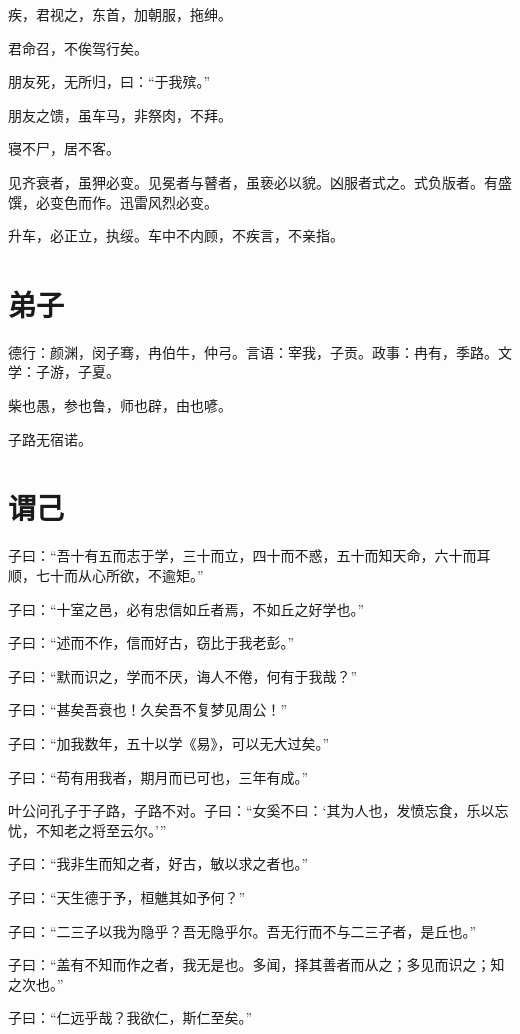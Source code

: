 \documentclass[a5paper]{ctexbook}
\begin{document}
    疾，君视之，东首，加朝服，拖绅。
    
    君命召，不俟驾行矣。

    朋友死，无所归，曰：“于我殡。”
    
    朋友之馈，虽车马，非祭肉，不拜。
    
    寝不尸，居不客。

    见齐衰者，虽狎必变。见冕者与瞽者，虽亵必以貌。凶服者式之。式负版者。有盛馔，必变色而作。迅雷风烈必变。

    升车，必正立，执绥。车中不内顾，不疾言，不亲指。

    \chapter{弟子}

    德行：颜渊，闵子骞，冉伯牛，仲弓。言语：宰我，子贡。政事：冉有，季路。文学：子游，子夏。

    柴也愚，参也鲁，师也辟，由也喭。

    子路无宿诺。

    \chapter{谓己}

    子曰：“吾十有五而志于学，三十而立，四十而不惑，五十而知天命，六十而耳顺，七十而从心所欲，不逾矩。”

    子曰：“十室之邑，必有忠信如丘者焉，不如丘之好学也。”

    子曰：“述而不作，信而好古，窃比于我老彭。”

    子曰：“默而识之，学而不厌，诲人不倦，何有于我哉？”

    子曰：“甚矣吾衰也！久矣吾不复梦见周公！”

    子曰：“加我数年，五十以学《易》，可以无大过矣。”

    子曰：“苟有用我者，期月而已可也，三年有成。”

    叶公问孔子于子路，子路不对。子曰：“女奚不曰：‘其为人也，发愤忘食，乐以忘忧，不知老之将至云尔。’”

    子曰：“我非生而知之者，好古，敏以求之者也。”

    子曰：“天生德于予，桓魋其如予何？”

    子曰：“二三子以我为隐乎？吾无隐乎尔。吾无行而不与二三子者，是丘也。”

    子曰：“盖有不知而作之者，我无是也。多闻，择其善者而从之；多见而识之；知之次也。”

    子曰：“仁远乎哉？我欲仁，斯仁至矣。”
\end{document}
